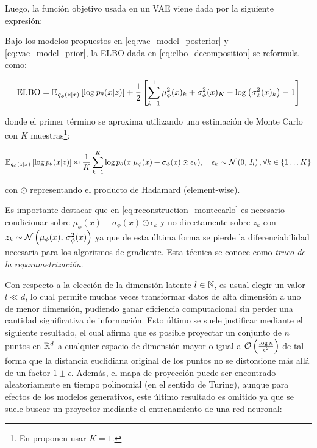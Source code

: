 Luego, la función objetivo usada en un VAE viene dada por la siguiente expresión:

\begin{prop}
    Bajo los modelos propuestos en \eqref{eq:vae_model_posterior} y \eqref{eq:vae_model_prior}, la ELBO dada en \eqref{eq:elbo_decomposition} se reformula como:

    \begin{equation}
        \label{eq:elbo_vae}
        \operatorname{ELBO}
        = \mathbb{E}_{q_\phi(z|x)}\left[\log p_\theta(x|z)\right] + \frac{1}{2}\left[
            \sum_{k=1}^1 \mu_\phi^2(x)_k + \sigma_\phi^2(x)_K
            - \log\left(\sigma_\phi^2(x)_k\right) - 1\right]
    \end{equation}

    donde el primer término se aproxima utilizando una estimación de Monte Carlo con $K$ muestras\footnote{En \cite{kingma2022autoencoding} proponen usar $K=1$.}:

    \begin{equation}
        \label{eq:reconstruction_montecarlo}
        \mathbb{E}_{q_\phi(z|x)}\left[\log p_\theta(x|z)\right]
        \approx \frac{1}{K}\sum_{k=1}^K \log p_\theta(x|\mu_\phi(x)+\sigma_\phi(x)\odot\epsilon_k),
        \quad
        \epsilon_k \sim \mathcal{N}\left(0,\,I_l\right), \forall k\in\{1\ldots K\}
    \end{equation}

    con $\odot$ representando el producto de Hadamard (element-wise).
\end{prop}

Es importante destacar que en \eqref{eq:reconstruction_montecarlo} es necesario condicionar sobre $\mu_\phi(x)+\sigma_\phi(x)\odot\epsilon_k$ y no directamente sobre $z_k$ con $z_k\sim \mathcal{N}\left(\mu_\phi(x),\,\sigma^2_\phi(x)\right)$ ya que de esta última forma se pierde la diferenciabilidad necesaria para los algoritmos de gradiente. Esta técnica se conoce como \textit{truco de la reparametrización}.

Con respecto a la elección de la dimensión latente $l\in\mathbb{N}$, es usual elegir un valor $l\ll d$, lo cual permite muchas veces transformar datos de alta dimensión a uno de menor dimensión, pudiendo ganar eficiencia computacional sin perder una cantidad significativa de información. Esto último se suele justificar mediante el siguiente resultado, el cual afirma que es posible proyectar un conjunto de $n$ puntos en $\mathbb{R}^d$ a cualquier espacio de dimensión mayor o igual a $\mathcal{O}\left(\frac{\log n}{\epsilon^2}\right)$ de tal forma que la distancia euclidiana original de los puntos no se distorsione más allá de un factor $1\pm\epsilon$. Además, el mapa de proyección puede ser encontrado aleatoriamente en tiempo polinomial (en el sentido de Turing), aunque para efectos de los modelos generativos, este último resultado es omitido ya que se suele buscar un proyector mediante el entrenamiento de una red neuronal:

